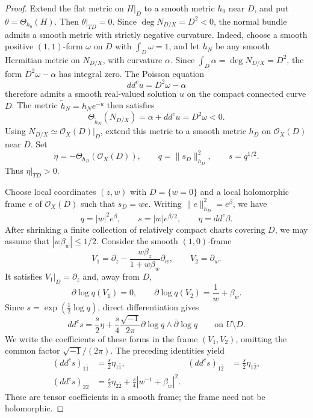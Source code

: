 \documentclass[11pt]{amsart}
\theoremstyle{definition}
\theoremstyle{remark}
\numberwithin{equation}{section}
\newcommand{\OO}{\mathcal O}
\newcommand{\ddc}{dd^c}
\newcommand{\barp}{\bar\partial}
\begin{document}
\begin{proof}
Extend the flat metric on $H|_D$ to a smooth metric $h_0$
near $D$, and put $\theta=\Theta_{h_0}(H)$.
Then $\theta|_{TD}=0$.
Since $\deg N_{D/X}=D^2<0$, the normal bundle admits a smooth
metric with strictly negative curvature. Indeed, choose a smooth positive $(1,1)$-form $\omega$ on $D$
with $\int_D\omega=1$, and let $h_N$ be any smooth Hermitian
metric on $N_{D/X}$, with curvature $\alpha$.
Since $\int_D\alpha=\deg N_{D/X}=D^2$, the form
$D^2\omega-\alpha$ has integral zero. The Poisson equation
\[
 \ddc u=D^2\omega-\alpha
\]
therefore admits a smooth real-valued solution $u$ on the
compact connected curve $D$. The metric
$\widetilde h_N=h_Ne^{-u}$ then satisfies
\[
 \Theta_{\widetilde h_N}(N_{D/X})
 =\alpha+\ddc u=D^2\omega<0.
\]
Using $N_{D/X}\simeq\OO_X(D)|_D$, extend this metric to a
smooth metric $h_D$ on $\OO_X(D)$ near $D$. Set
\[
 \eta=-\Theta_{h_D}(\OO_X(D)),\qquad
 q=\|s_D\|_{h_D}^2,\qquad s=q^{1/2}.
\]
Thus $\eta|_{TD}>0$.

Choose local coordinates $(z,w)$ with $D=\{w=0\}$ and
a local holomorphic frame $e$ of $\OO_X(D)$ such that
$s_D=we$. Writing $\|e\|_{h_D}^2=e^\beta$, we have
\begin{equation}\label{eq:baseline-metric}
 q=|w|^2e^\beta,\qquad
 s=|w|e^{\beta/2},\qquad
 \eta=\ddc\beta.
\end{equation}
After shrinking a finite collection of relatively compact
charts covering $D$, we may assume that $|w\beta_w|\le1/2$.
Consider the smooth $(1,0)$-frame
\[
 V_1=\partial_z-\frac{w\beta_z}{1+w\beta_w}\partial_w,
 \qquad V_2=\partial_w.
\]
It satisfies $V_1|_D=\partial_z$ and, away from $D$,
\[
 \partial\log q(V_1)=0,\qquad
 \partial\log q(V_2)=\frac1w+\beta_w.
\]
Since $s=\exp(\tfrac12\log q)$, direct differentiation gives
\begin{equation}\label{eq:scaled-cusp}
 \ddc s=\frac{s}{2}\eta+
 \frac{s}{4}\frac{\sqrt{-1}}{2\pi}
 \partial\log q\wedge\barp\log q
 \qquad\text{on }U\setminus D.
\end{equation}
We write the coefficients of these forms in the frame
$(V_1,V_2)$, omitting the common factor $\sqrt{-1}/(2\pi)$.
The preceding identities yield
\[
 \begin{aligned}
 (\ddc s)_{1\bar1}&=\frac{s}{2}\eta_{1\bar1},&
 (\ddc s)_{1\bar2}&=\frac{s}{2}\eta_{1\bar2},\\
 (\ddc s)_{2\bar2}&=\frac{s}{2}\eta_{2\bar2}
   +\frac{s}{4}|w^{-1}+\beta_w|^2.
 \end{aligned}
\]
These are tensor coefficients in a smooth frame; the frame
need not be holomorphic.


\end{proof}
\end{document}
